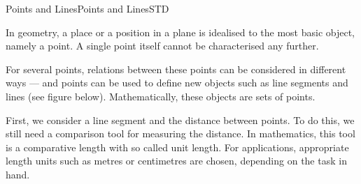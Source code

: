 \begin{MXContent}{Points and Lines}{Points and Lines}{STD}

In geometry, a place or a position in a plane is idealised to the 
most basic object, namely a point. A single point itself cannot be characterised any further. 

For several points, relations between these points can be considered in different ways --- 
and points can be used to define new objects such as line segments and lines (see figure below).
Mathematically, these objects are sets of points.

\begin{center}
\end{center}

First, we consider a line segment and the distance between points. To do this, 
we still need a comparison tool for measuring the distance. In mathematics,
this tool is a comparative length with so called unit length. For applications, 
appropriate length units such as metres or centimetres are chosen, depending 
on the task in hand.


\end{MXContent}
